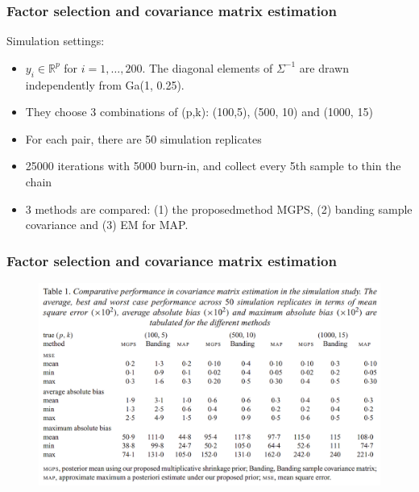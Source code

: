 \documentclass{beamer}
\begin{document}
	\begin{frame}
		\frametitle{Factor selection and covariance matrix estimation}
		Simulation settings:
		\begin{itemize}
			\item 
			$y_i \in \mathbb{R}^p$ for $i=1,\ldots,200$. The diagonal elements of $\Sigma^{-1}$ are drawn independently from Ga(1, 0.25).
			\item
			They choose 3 combinations of (p,k): (100,5), (500, 10) and (1000, 15)
			\item
			For each pair, there are 50 simulation replicates
			\item
			25000 iterations with 5000 burn-in, and collect every 5th sample to thin the chain
			\item
			3 methods are compared: (1) the proposedmethod MGPS, (2) banding sample covariance and (3) EM for MAP.
		\end{itemize}
	\end{frame}
	
	\begin{frame}
		\frametitle{Factor selection and covariance matrix estimation}
		\begin{figure}
			\includegraphics[width=0.9\linewidth]{image004.png}
		\end{figure}
	\end{frame}
	
\end{document}
